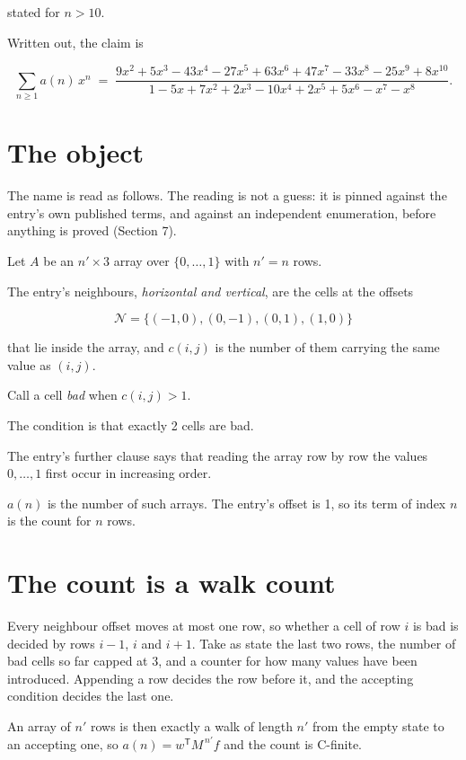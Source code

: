 \documentclass[11pt]{article}
\theoremstyle{definition}
\begin{document}
stated for $n > 10$.

Written out, the claim is

\[\sum_{n \ge 1} a(n)\,x^n \;=\; \frac{9x^{2} + 5x^{3} - 43x^{4} - 27x^{5} + 63x^{6} + 47x^{7} - 33x^{8} - 25x^{9} + 8x^{10}}{1 - 5x + 7x^{2} + 2x^{3} - 10x^{4} + 2x^{5} + 5x^{6} - x^{7} - x^{8}}.\]

\section{The object}

The name is read as follows. The reading is not a guess: it is pinned against the entry's own published terms, and against an independent enumeration, before anything is proved (Section 7).

Let $A$ be an $n' \times 3$ array over $\{0,\dots,1\}$ with $n' = n$ rows.

The entry's neighbours, {\itshape horizontal and vertical}, are the cells at the offsets

\[\mathcal{N} = \{(-1,0), (0,-1), (0,1), (1,0)\}\]

that lie inside the array, and $c(i,j)$ is the number of them carrying the same value as $(i,j)$.

Call a cell {\itshape bad} when $c(i,j) > 1$.

The condition is that exactly 2 cells are bad.

The entry's further clause says that reading the array row by row the values $0,\dots,1$ first occur in increasing order.

$a(n)$ is the number of such arrays. The entry's offset is 1, so its term of index $n$ is the count for $n$ rows.

\section{The count is a walk count}

Every neighbour offset moves at most one row, so whether a cell of row $i$ is bad is decided by rows $i-1$, $i$ and $i+1$. Take as state the last two rows, the number of bad cells so far capped at 3, and a counter for how many values have been introduced. Appending a row decides the row before it, and the accepting condition decides the last one.

An array of $n'$ rows is then exactly a walk of length $n'$ from the empty state to an accepting one, so $a(n) = w^{\mathsf T}M^{\,n'}f$ and the count is C-finite.
\end{document}
